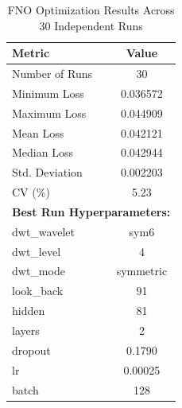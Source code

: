 \begin{table}[htbp]
\centering
\caption{FNO Optimization Results Across 30 Independent Runs}
\label{tab:fno_results}
\begin{tabular}{lc}
\hline
\textbf{Metric} & \textbf{Value} \\
\hline
Number of Runs & 30 \\
Minimum Loss   & 0.036572 \\
Maximum Loss   & 0.044909 \\
Mean Loss      & 0.042121 \\
Median Loss    & 0.042944 \\
Std. Deviation & 0.002203 \\
CV (\%)       & 5.23 \\
\hline
\multicolumn{2}{l}{\textbf{Best Run Hyperparameters:}} \\
dwt\_wavelet   & sym6 \\
dwt\_level     & 4 \\
dwt\_mode      & symmetric \\
look\_back     & 91 \\
hidden         & 81 \\
layers         & 2 \\
dropout        & 0.1790 \\
lr             & 0.00025 \\
batch          & 128 \\
\hline
\end{tabular}
\end{table}
